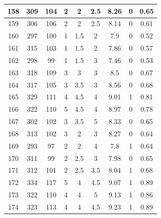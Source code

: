 \documentclass[11pt]{article}
\begin{document}
\begin{appendix}
\begin{longtable}[H]{|c|c|c|c|c|c|c|c|c|}
	158        & 309       & 104         & 2                 & 2   & 2.5 & 8.26 & 0        & 0.65            \\ \hline
	159        & 306       & 106         & 2                 & 2   & 2.5 & 8.14 & 0        & 0.61            \\ \hline
	160        & 297       & 100         & 1                 & 1.5 & 2   & 7.9  & 0        & 0.52            \\ \hline
	161        & 315       & 103         & 1                 & 1.5 & 2   & 7.86 & 0        & 0.57            \\ \hline
	162        & 298       & 99          & 1                 & 1.5 & 3   & 7.46 & 0        & 0.53            \\ \hline
	163        & 318       & 109         & 3                 & 3   & 3   & 8.5  & 0        & 0.67            \\ \hline
	164        & 317       & 105         & 3                 & 3.5 & 3   & 8.56 & 0        & 0.68            \\ \hline
	165        & 329       & 111         & 4                 & 4.5 & 4   & 9.01 & 1        & 0.81            \\ \hline
	166        & 322       & 110         & 5                 & 4.5 & 4   & 8.97 & 0        & 0.78            \\ \hline
	167        & 302       & 102         & 3                 & 3.5 & 5   & 8.33 & 0        & 0.65            \\ \hline
	168        & 313       & 102         & 3                 & 2   & 3   & 8.27 & 0        & 0.64            \\ \hline
	169        & 293       & 97          & 2                 & 2   & 4   & 7.8  & 1        & 0.64            \\ \hline
	170        & 311       & 99          & 2                 & 2.5 & 3   & 7.98 & 0        & 0.65            \\ \hline
	171        & 312       & 101         & 2                 & 2.5 & 3.5 & 8.04 & 1        & 0.68            \\ \hline
	172        & 334       & 117         & 5                 & 4   & 4.5 & 9.07 & 1        & 0.89            \\ \hline
	173        & 322       & 110         & 4                 & 4   & 5   & 9.13 & 1        & 0.86            \\ \hline
	174        & 323       & 113         & 4                 & 4   & 4.5 & 9.23 & 1        & 0.89            \\ \hline

\end{longtable}
\end{appendix}
\end{document}
